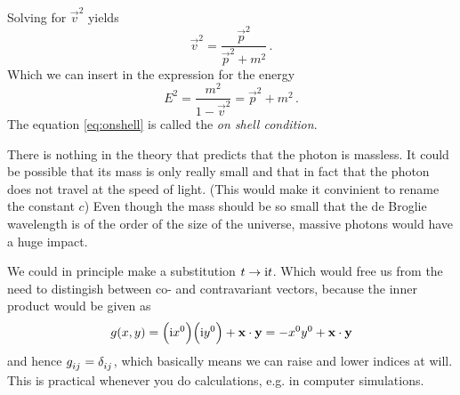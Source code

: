 Solving for $\vec{v}^2$ yields
\begin{equation}
    \vec{v}^2=\frac{\vec{p}^2}{\vec{p}^2+m^2}\, .
\end{equation}
Which we can insert in the expression for the energy
\begin{equation}
    E^2=\frac{m^2}{1-\vec{v}^2}=\vec{p}^2+m^2 \label{eq:onshell}\, .
\end{equation}
The equation \eqref{eq:onshell} is called the \emph{on shell condition}.
\begin{sidenote}
There is nothing in the theory that predicts that the photon is massless. It
could be possible that its mass is only really small and that in fact that the
photon does not travel at the speed of light. (This would make it
convinient to rename the constant $c$) Even though the mass should be so small
that the de Broglie wavelength is of the order of the size of the universe,
massive photons would have a huge impact.
\end{sidenote}
\begin{sidenote}
We could in principle make a substitution $t\to \mathrm{i} t$. Which would free us
from the need to distingish between co- and contravariant vectors, because the
inner product would be given as
\begin{equation}
    g(x,y)=\left(\imI x^0\right)\left(\imI
    y^0\right)+\vec{x}\cdot\vec{y}=-x^0y^0+\vec{x}\cdot\vec{y}
\end{equation}
and hence $\tensor{g}{_i_j}=\tensor{\delta}{_i_j}$, which basically means we can
raise and lower indices at will. This is practical whenever you do calculations,
e.g. in computer simulations.
\end{sidenote}
